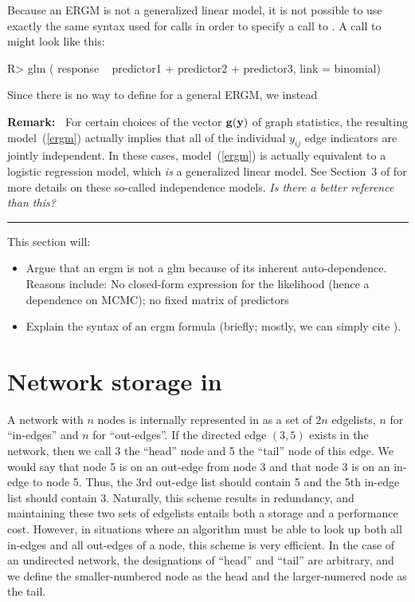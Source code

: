 \documentclass[article]{jss}
\def\vec#1{\mathchoice{\mbox{\boldmath$\displaystyle\bf#1$}}
{\mbox{\boldmath$\textstyle\bf#1$}}
{\mbox{\boldmath$\scriptstyle\bf#1$}}
{\mbox{\boldmath$\scriptscriptstyle\bf#1$}}}
\begin{document}
Because an ERGM is not a generalized linear model,
it is not possible to use exactly the same  syntax used for
 calls  in order to specify a call to .  
A call to  might look like this:
\begin{CodeChunk}
\begin{CodeInput} 
R> glm ( response ~ predictor1 + predictor2 + predictor3, link = binomial)
\end{CodeInput}
\end{CodeChunk}
Since there is no way to define  for a general ERGM,
we instead 

{\bf Remark:\ }
For certain choices of the vector $\vec g(\vec y)$ of graph statistics, the resulting
model~(\ref{ergm}) actually implies that all of the individual $y_{ij}$ edge indicators
are jointly independent.  In these cases, model~(\ref{ergm}) is actually equivalent
to a logistic regression model, which {\em is} a generalized linear model.
See Section~3 of \citet{HunGoodHan08} for more details on these so-called
independence models.
{\em Is there a better reference than this?}

\vspace{2ex}
\hrule

This section will:
\begin{itemize}
\item Argue that an ergm is not a glm because of its inherent auto-dependence.
Reasons include:  No closed-form expression for the likelihood (hence a dependence
on MCMC); no fixed matrix of predictors
\item Explain the syntax of an ergm formula (briefly; mostly, we can simply cite
\citet{ergmtermsjss}).
\end{itemize}

\section[Network storage in ergm]{Network storage in }

A network with $n$ nodes is
internally represented in  as a set of $2n$ edgelists, 
$n$ for ``in-edges'' and $n$ for ``out-edges''.  If the directed edge $(3,5)$ exists in the network,
then we call 3 the ``head'' node and 5 the ``tail'' node of this edge.  We would say that node 5 is
on an out-edge from node 3 and that node 3 is on an in-edge to node 5.  Thus, the 3rd out-edge list
should contain 5 and the 5th in-edge list should contain 3.  Naturally, this scheme results in 
redundancy, and maintaining these two sets of edgelists entails both a storage and a performance
cost.  However, in situations where an algorithm must be able to look up both all in-edges and all
out-edges of a node, this scheme is very efficient.  
In the case of an undirected network, the designations of ``head'' and ``tail'' are arbitrary, and we
define the smaller-numbered node as the head and the larger-numered node as the tail.  
\end{document}
